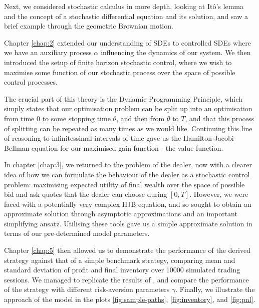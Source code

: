 Next, we considered stochastic calculus in more depth, looking at It\^{o}'s lemma 
and the concept of a stochastic differential equation and its solution, and saw a brief 
example through the geometric Brownian motion.

Chapter \ref{chap:2} extended our understanding of SDEs to controlled SDEs where we 
have an auxiliary process $\alpha$ influencing the dynamics of our system. We then 
introduced the setup of finite horizon stochastic control, where we wish to maximise 
some function of our stochastic process over the space of possible control processes.

The crucial part of this theory is the Dynamic Programming Principle, which simply states
that our optimisation problem can be split up into an optimisation from time 0 to 
some stopping time $\theta$, and then from $\theta$ to $T$, and that this process of 
splitting can be repeated as many times as we would like. Continuing this line of reasoning
to infinitessimal intervals of time gave us the Hamilton-Jacobi-Bellman equation for 
our maximised gain function - the value function.

In chapter \ref{chap:3}, we returned to the problem of the dealer, now with a clearer 
idea of how we can formulate the behaviour of the dealer as a stochastic control problem:
maximising expected utility of final wealth over the space of possible bid and ask quotes
that the dealer can choose during $[0,T]$. However, we were faced with a potentially 
very complex HJB equation, and so sought to obtain an approximate solution through 
asymptotic approximations and an important simplifying ansatz. Utilising these tools 
gave us a simple approximate solution in terms of our pre-determined model parameters.

Chapter \ref{chap:5} then allowed us to demonstrate the performance of the derived 
strategy against that of a simple benchmark strategy, comparing mean and standard 
deviation of profit and final inventory over 10000 simulated trading sessions. We 
managed to replicate the results of \cite{AS2008}, and compare the performance of the 
strategy with different risk-aversion parameters $\gamma$. Finally, we illustrate 
the approach of the model in the plots \ref{fig:sample-paths}, \ref{fig:inventory},
and \ref{fig:pnl}.
